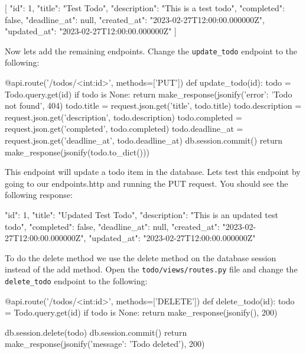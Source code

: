\documentclass{csse4400}
\begin{document}
\begin{code}[language=json,numbers=none]{}
  [
    {
      "id": 1,
      "title": "Test Todo",
      "description": "This is a test todo",
      "completed": false,
      "deadline_at": null,
      "created_at": "2023-02-27T12:00:00.000000Z",
      "updated_at": "2023-02-27T12:00:00.000000Z"
    }
  ]
\end{code}

Now lets add the remaining endpoints. Change the \texttt{update\_todo} endpoint to the following:

\begin{code}[language=python,numbers=none]{}
  @api.route('/todos/<int:id>', methods=['PUT'])
  def update_todo(id):
      todo = Todo.query.get(id)
      if todo is None:
          return make_response(jsonify({'error': 'Todo not found'}, 404)
      todo.title = request.json.get('title', todo.title)
      todo.description = request.json.get('description', todo.description)
      todo.completed = request.json.get('completed', todo.completed)
      todo.deadline_at = request.json.get('deadline_at', todo.deadline_at)
      db.session.commit()
      return make_response(jsonify(todo.to_dict()))

\end{code}

This endpoint will update a todo item in the database. Lets test this endpoint by going to our endpoints.http and running the PUT request. You should see the following response:

\begin{code}[language=json,numbers=none]{}
  {
    "id": 1,
    "title": "Updated Test Todo",
    "description": "This is an updated test todo",
    "completed": false,
    "deadline_at": null,
    "created_at": "2023-02-27T12:00:00.000000Z",
    "updated_at": "2023-02-27T12:00:00.000000Z"
  }

\end{code}

To do the delete method we use the delete method on the database session instead of the add method. Open the \texttt{todo/views/routes.py} file and change the \texttt{delete\_todo} endpoint to the following:

\begin{code}[language=python,numbers=none]{}
  @api.route('/todos/<int:id>', methods=['DELETE'])
  def delete_todo(id):
      todo = Todo.query.get(id)
      if todo is None:
          return make_response(jsonify(), 200)

      db.session.delete(todo)
      db.session.commit()
      return make_response(jsonify({'message': 'Todo deleted'}), 200)

\end{code}
\end{document}
